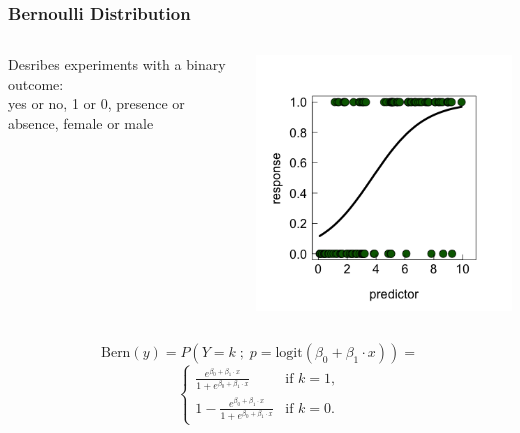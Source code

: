 \documentclass{beamer}
\begin{document}
\begin{frame}
    \frametitle{Bernoulli Distribution}
    \large
    \begin{columns}
        \begin{column}{0.5\textwidth}
            Desribes experiments with a binary outcome:\\
            yes or no, 1 or 0, presence or absence, female or male
        \end{column}
        \begin{column}{0.5\textwidth}
            \includegraphics[width=\textwidth]{lectures/day_9_refreshing_glm/figures/unnamed-chunk-8-1.png}
        \end{column}
    \end{columns}
\[
\text{Bern}(y) = P(Y = k \;;\; p = \text{logit}(\beta_0 + \beta_1 \cdot x)) =
\]
\[
\begin{cases} 
\frac{e^{\beta_0 + \beta_1 \cdot x}}{1 + e^{\beta_0 + \beta_1 \cdot x}} & \text{if } k = 1, \\
1 - \frac{e^{\beta_0 + \beta_1 \cdot x}}{1 + e^{\beta_0 + \beta_1 \cdot x}} & \text{if } k = 0.
\end{cases}
\]

\end{frame}
\end{document}
